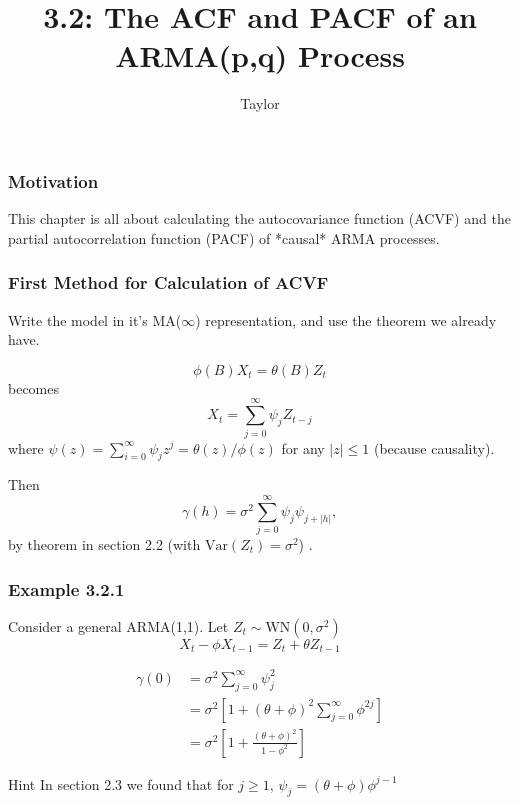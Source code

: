 \documentclass{beamer}
\title["3.2"]{3.2: The ACF and PACF of an ARMA(p,q) Process}
\author{Taylor}
\institute[UVA] 
{
University of Virginia \\
\medskip
\textit{} 
}
\date{}
\begin{document}

\begin{frame}
\titlepage 
\end{frame}

\begin{frame}
\frametitle{Motivation}

This chapter is all about calculating the autocovariance function (ACVF) and the partial autocorrelation function (PACF) of *causal* ARMA processes.
\newline


\end{frame}


\begin{frame}
\frametitle{First Method for Calculation of ACVF}

Write the model in it's MA($\infty$) representation, and use the theorem we already have.
\newline

\[
\phi(B)X_t = \theta(B)Z_t
\]
becomes
\[
X_t = \sum_{j=0}^{\infty}\psi_jZ_{t-j}
\]
where $\psi(z) = \sum_{i=0}^{\infty} \psi_jz^j =  \theta(z)/\phi(z)$ for any $|z|\le 1$ (because causality).
\newline

Then
\[
\gamma(h) = \sigma^2\sum_{j=0}^{\infty}\psi_j \psi_{j+|h|},
\]
by theorem in section 2.2 (with $\text{Var}(Z_t) = \sigma^2$) .





\end{frame}



\begin{frame}
\frametitle{Example 3.2.1}

Consider a general ARMA(1,1). Let $Z_t \sim \text{WN}(0,\sigma^2)$
\[
X_t - \phi X_{t-1} = Z_t + \theta Z_{t-1}
\]

\begin{align*}
\gamma(0) &= \sigma^2\sum_{j=0}^{\infty} \psi_j^2 \\
&= \sigma^2\left[1 + (\theta + \phi)^2\sum_{j=0}^{\infty}\phi^{2j}\right] \\
&= \sigma^2\left[ 1 + \frac{(\theta+\phi)^2 }{1 - \phi^2 } \right]
\end{align*}

\begin{block}{Hint}
In section 2.3 we found that for $j \ge 1$, $\psi_j = (\theta+\phi)\phi^{j-1}$
\end{block}


\end{frame}
\end{document}
